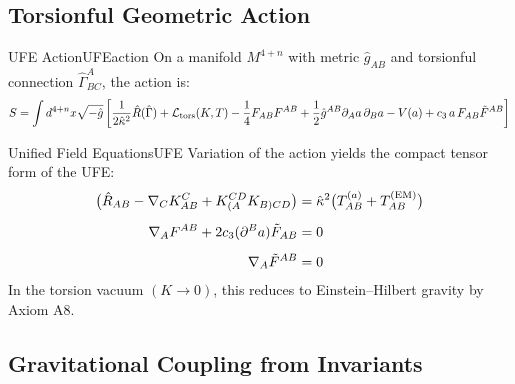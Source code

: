 \subsection{Torsionful Geometric Action}

\begin{definition}{UFE Action}{UFEaction}
On a manifold $M^{4+n}$ with metric $\hat{g}_{AB}$ and torsionful connection 
$\hat{\Gamma}^A_{BC}$, the action is:
\begin{equation}
    S = \int d^{4+n}x\sqrt{-\hat{g}}\left[
        \frac{1}{2\hat{\kappa}^2}\hat{R}(\hat{\Gamma}) 
        + \mathcal{L}_{\text{tors}}(K,T) 
        - \frac{1}{4}F_{AB}F^{AB}
        + \frac{1}{2}\hat{g}^{AB}\partial_A a\,\partial_B a 
        - V(a) 
        + c_3\, a\, F_{AB}\tilde{F}^{AB}
    \right]
\end{equation}
\end{definition}

\begin{theorem}{Unified Field Equations}{UFE}
Variation of the action yields the compact tensor form of the UFE:
\begin{align}
    \bigl(\hat{R}_{AB} - \nabla_C K^C_{AB} + K_{(A}^{CD}K_{B)CD}\bigr) 
        &= \hat{\kappa}^2\bigl(T^{(a)}_{AB} + T^{(\text{EM})}_{AB}\bigr)
        \label{eq:UFE}\\[0.5em]
    \nabla_A F^{AB} + 2c_3(\partial^B a)\tilde{F}_{AB} &= 0
        \label{eq:maxwell}\\[0.5em]
    \nabla_A\tilde{F}^{AB} &= 0
        \label{eq:bianchi}
\end{align}
In the torsion vacuum $(K \to 0)$, this reduces to Einstein--Hilbert gravity 
by Axiom A8.
\end{theorem}

\subsection{Gravitational Coupling from Invariants}

